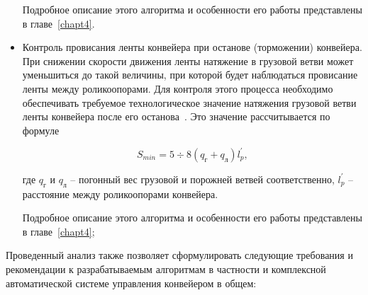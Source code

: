 \begin{itemize}
Подробное описание этого алгоритма и особенности его работы представлены в главе~\ref{chapt4}.

\item Контроль провисания ленты конвейера при останове (торможении) конвейера. При снижении скорости движения ленты натяжение в грузовой ветви может уменьшиться до такой величины, при которой будет наблюдаться провисание ленты между роликоопорами. 
Для контроля этого процесса необходимо обеспечивать требуемое технологическое значение натяжения грузовой ветви ленты конвейера после его останова~\cite{vdmitriev}. Это значение рассчитывается по формуле

$$ S_{min} = 5 \div 8(q_\text{г} + q_\text{л})l_p^{'}, $$

где $ q_\text{г}$ и $q_\text{л} $ -- погонный вес грузовой и порожней ветвей соответственно, $ l_p^{'} $ -- расстояние между роликоопорами конвейера.

Подробное описание этого алгоритма и особенности его работы представлены в главе~\ref{chapt4};

\end{itemize}

Проведенный анализ также позволяет сформулировать следующие требования и рекомендации к разрабатываемым алгоритмам в частности и комплексной автоматической системе управления конвейером в общем:

